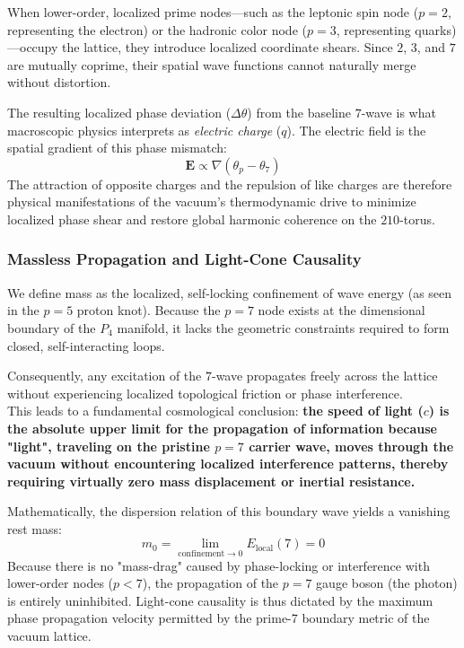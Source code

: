 \documentclass[11pt,a4paper]{article}
\theoremstyle{plain}
\theoremstyle{definition}
\theoremstyle{remark}
\begin{document}
When lower-order, localized prime nodes—such as the leptonic spin node ($p = 2$, representing the electron) or the hadronic color node ($p = 3$, representing quarks)—occupy the lattice, they introduce localized coordinate shears. Since $2$, $3$, and $7$ are mutually coprime, their spatial wave functions cannot naturally merge without distortion. 

The resulting localized phase deviation ($\Delta \theta$) from the baseline $7$-wave is what macroscopic physics interprets as \textit{electric charge} ($q$). The electric field is the spatial gradient of this phase mismatch:
\begin{equation}
\mathbf{E} \propto \nabla \left( \theta_p - \theta_7 \right)
\end{equation}
The attraction of opposite charges and the repulsion of like charges are therefore physical manifestations of the vacuum's thermodynamic drive to minimize localized phase shear and restore global harmonic coherence on the $210$-torus.

\subsubsection{Massless Propagation and Light-Cone Causality}

We define mass as the localized, self-locking confinement of wave energy (as seen in the $p=5$ proton knot). 
Because the $p=7$ node exists at the dimensional boundary of the $P_4$ manifold, it lacks the geometric constraints required to form closed, self-interacting loops. 

Consequently, any excitation of the $7$-wave propagates freely across the lattice without experiencing localized topological friction or phase interference. \\
This leads to a fundamental cosmological conclusion: \textbf{the speed of light ($c$) is the absolute upper limit for the propagation of information because "light", traveling on the pristine $p=7$ carrier wave, moves through the vacuum without encountering localized interference patterns, thereby requiring virtually zero mass displacement or inertial resistance.} 

Mathematically, the dispersion relation of this boundary wave yields a vanishing rest mass:
\begin{equation}
m_0 = \lim_{\text{confinement} \to 0} E_{\text{local}}(7) = 0
\end{equation}
Because there is no "mass-drag" caused by phase-locking or interference with lower-order nodes ($p < 7$), the propagation of the $p=7$ gauge boson (the photon) is entirely uninhibited. Light-cone causality is thus dictated by the maximum phase propagation velocity permitted by the prime-7 boundary metric of the vacuum lattice.
\end{document}
